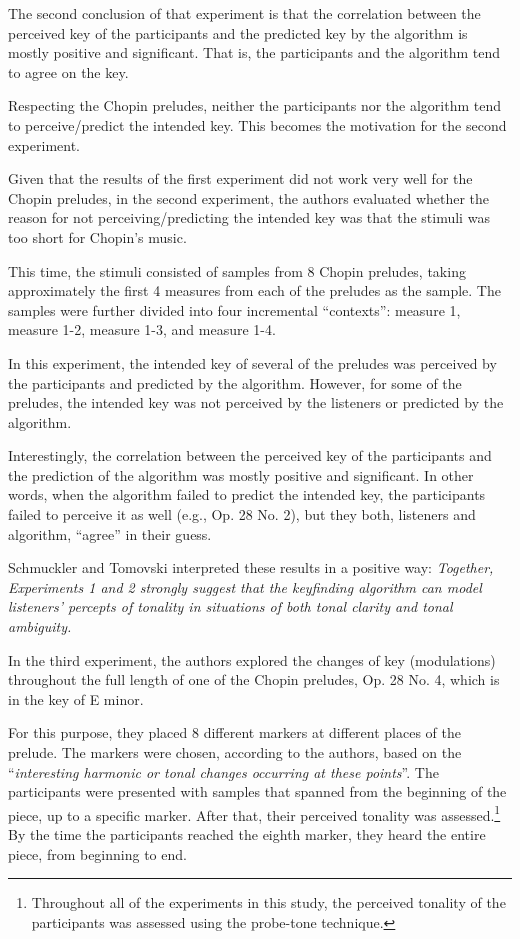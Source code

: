 The second conclusion of that experiment is that the correlation between the perceived key of the participants and the predicted key by the algorithm is mostly positive and significant. That is, the participants and the algorithm tend to agree on the key.

Respecting the Chopin preludes, neither the participants nor the algorithm tend to perceive/predict the intended key. This becomes the motivation for the second experiment.


Given that the results of the first experiment did not work very well for the Chopin preludes, in the second experiment, the authors evaluated whether the reason for not perceiving/predicting the intended key was that the stimuli was too short for Chopin's music.

This time, the stimuli consisted of samples from 8 Chopin preludes, taking approximately the first 4 measures from each of the preludes as the sample. The samples were further divided into four incremental ``contexts'': measure 1, measure 1-2, measure 1-3, and measure 1-4.

In this experiment, the intended key of several of the preludes was perceived by the participants and predicted by the algorithm. However, for some of the preludes, the intended key was not perceived by the listeners or predicted by the algorithm. 

Interestingly, the correlation between the perceived key of the participants and the prediction of the algorithm was mostly positive and significant. In other words, when the algorithm failed to predict the intended key, the participants failed to perceive it as well (e.g., Op. 28 No. 2), but they both, listeners and algorithm, ``agree'' in their guess.

Schmuckler and Tomovski interpreted these results in a positive way: \emph{Together, Experiments 1 and 2 strongly suggest that the keyfinding algorithm can model listeners’ percepts of tonality in situations of both tonal clarity and tonal ambiguity.}


In the third experiment, the authors explored the changes of key (modulations) throughout the full length of one of the Chopin preludes, Op. 28 No. 4, which is in the key of E minor.

For this purpose, they placed 8 different markers at different places of the prelude. The markers were chosen, according to the authors, based on the ``\emph{interesting harmonic or tonal changes occurring at these points}''. The participants were presented with samples that spanned from the beginning of the piece, up to a specific marker. After that, their perceived tonality was assessed.\footnote{Throughout all of the experiments in this study, the perceived tonality of the participants was assessed using the probe-tone technique.} By the time the participants reached the eighth marker, they heard the entire piece, from beginning to end.

